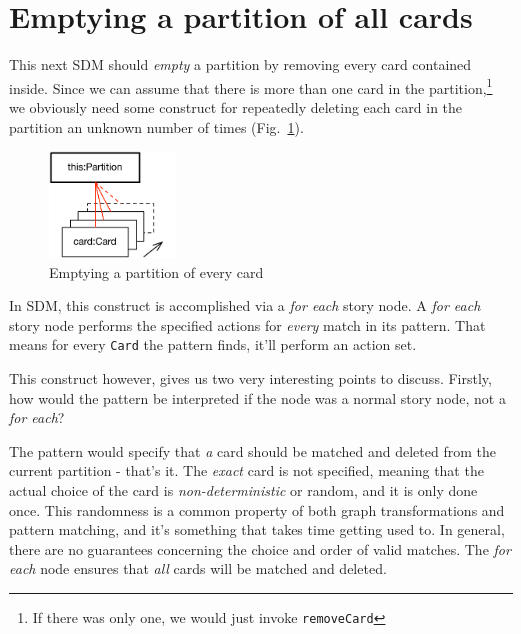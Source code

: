 \newpage
\section{Emptying a partition of all cards}
\genHeader
\hypertarget{sec:emptyPartition}{}

This next SDM should \emph{empty} a partition by removing every card contained inside. Since we can assume that there is more than one card in the
partition,\footnote{If there was only one, we would just invoke \texttt{removeCard}} we obviously need some construct for repeatedly deleting each card in the
partition an unknown number of times (Fig.~\ref{fig:goal_empty}). 

\vspace{0.5cm}

\begin{figure}[htbp]
	\centering
  \includegraphics[width=0.3\textwidth]{goal_partitionEmpty.pdf}
	\caption{Emptying a partition of every card}
	\label{fig:goal_empty}
\end{figure}
\FloatBarrier

\vspace{0.5cm}

In SDM, this  construct is accomplished via a \emph{for each} story node. A
\emph{for each} story node performs the specified actions for \emph{every} match in its pattern. That means for every \texttt{Card} the pattern finds, it'll
perform an action set.

This construct however, gives us two very interesting points to discuss. Firstly, how would the pattern be interpreted if the node was a normal story node, not
a \emph{for each}?

The pattern would specify that \emph{a} card should be matched and deleted from the current partition - that's it. The \emph{exact} card is not specified,
meaning that the actual choice of the card is \emph{non-deterministic} or random, and it is only done once. This randomness is a common property of both graph
transformations and pattern matching, and it's something that takes time getting used to.  In general, there are no guarantees concerning the choice and
order of valid matches. The \emph{for each} node ensures that \emph{all} cards will be matched and deleted.

